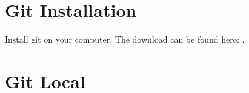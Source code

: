 \documentclass[english]{sheet}
\subtitle{Version Control\textemdash{}Git}
\begin{document}
\maketitle

\section{Git Installation}

\begin{exercise}
    Install git on your computer. The download can be found here: .
\end{exercise}

\section{Git Local}
\end{document}
